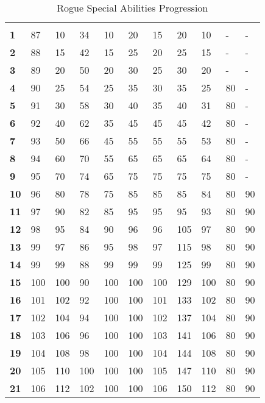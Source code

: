\begin {table}[H]
  \caption{Rogue Special Abilities Progression}
  \begin{tabularx}{\columnwidth}{>{\bfseries}YYYYYYYYYYY}\label{tab:Rogue Special Abilities Progression}
		 &  &  &  &  &  &  &  &  &  & \\
		1 & 87 & 10 & 34 & 10 & 20 & 15 & 20 & 10 & - & -\\
		2 & 88 & 15 & 42 & 15 & 25 & 20 & 25 & 15 & - & -\\
		3 & 89 & 20 & 50 & 20 & 30 & 25 & 30 & 20 & - & -\\
		4 & 90 & 25 & 54 & 25 & 35 & 30 & 35 & 25 & 80 & -\\
		5 & 91 & 30 & 58 & 30 & 40 & 35 & 40 & 31 & 80 & -\\
		6 & 92 & 40 & 62 & 35 & 45 & 45 & 45 & 42 & 80 & -\\
		7 & 93 & 50 & 66 & 45 & 55 & 55 & 55 & 53 & 80 & -\\
		8 & 94 & 60 & 70 & 55 & 65 & 65 & 65 & 64 & 80 & -\\
		9 & 95 & 70 & 74 & 65 & 75 & 75 & 75 & 75 & 80 & -\\
		10 & 96 & 80 & 78 & 75 & 85 & 85 & 85 & 84 & 80 & 90\\
		11 & 97 & 90 & 82 & 85 & 95 & 95 & 95 & 93 & 80 & 90\\
		12 & 98 & 95 & 84 & 90 & 96 & 96 & 105 & 97 & 80 & 90\\
		13 & 99 & 97 & 86 & 95 & 98 & 97 & 115 & 98 & 80 & 90\\
		14 & 99 & 99 & 88 & 99 & 99 & 99 & 125 & 99 & 80 & 90\\
		15 & 100 & 100 & 90 & 100 & 100 & 100 & 129 & 100 & 80 & 90\\
		16 & 101 & 102 & 92 & 100 & 100 & 101 & 133 & 102 & 80 & 90\\
		17 & 102 & 104 & 94 & 100 & 100 & 102 & 137 & 104 & 80 & 90\\
		18 & 103 & 106 & 96 & 100 & 100 & 103 & 141 & 106 & 80 & 90\\
		19 & 104 & 108 & 98 & 100 & 100 & 104 & 144 & 108 & 80 & 90\\
		20 & 105 & 110 & 100 & 100 & 100 & 105 & 147 & 110 & 80 & 90\\
		21 & 106 & 112 & 102 & 100 & 100 & 106 & 150 & 112 & 80 & 90\\

\end{tabularx}
\end{table}
